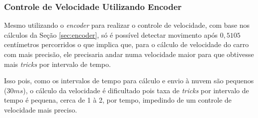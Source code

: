         
		\subsubsection{Controle de Velocidade Utilizando Encoder} \label{sec:problema_encoder}
        	Mesmo utilizando o \textit{encoder} para realizar o controle de velocidade, com base nos cálculos da Seção \ref{sec:encoder}, só é possível detectar movimento após $0,5105$ centímetros percorridos o que implica que, para o cálculo de velocidade do carro com mais precisão, ele precisaria andar numa velocidade maior para que obtivesse mais \textit{tricks} por intervalo de tempo.

			Isso pois, como os intervalos de tempo para cálculo e envio à nuvem são pequenos ($ 30 ms $), o cálculo da velocidade é dificultado pois taxa de \textit{tricks} por intervalo de tempo é pequena, cerca de 1 à 2, por tempo, impedindo de um controle de velocidade mais preciso.


